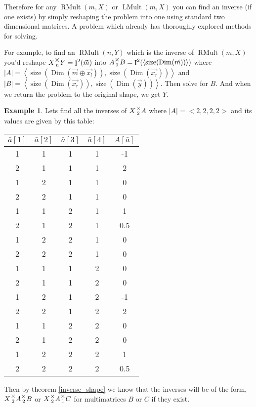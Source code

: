 \documentclass[12pt]{book}
\theoremstyle{plain}
\theoremstyle{definition}
\newtheorem{example}{Example}[chapter]
\theoremstyle{ppart}
\theoremstyle{case}
\theoremstyle{solution}
\DeclareMathOperator{\Dim}{Dim}
\DeclareMathOperator{\Ident}{I}
\DeclareMathOperator{\RMult}{RMult}
\DeclareMathOperator{\LMult}{LMult}
\DeclareMathOperator{\size}{size}
\newcommand{\mmult}[1]{\text{\raisebox{1ex}{$\underset{#1}{\times}$}}}
\newcommand{\shape}[1]{\left|#1\right|}
\begin{document}
Therefore for any $\RMult(m,X)$ or $\LMult(m,X)$ you can find an inverse (if one exists)
by simply reshaping the problem into one using standard two dimensional matrices.
A problem which already has thoroughly explored methods for solving.

For example, to find an $\RMult(n,Y)$ which is the inverse of $\RMult(m,X)$
you'd reshape $X \mmult{n} Y = \Ident^2(\vec{m})$ into $A \mmult{1} B = \Ident^2(\left<\size(\Dim(\vec{m}))\right>)$
where $\shape{A} = \left<\size(\Dim(\vec{m} \oplus \vec{x_l})), \size(\Dim(\vec{x_r}))\right>$
and   $\shape{B} = \left<\size(\Dim(\vec{x_r})),  \size(\Dim(\vec{y}))\right>$.
Then solve for $B$. And when we return the problem to the original shape, we get $Y$.

\begin{example}
Lets find all the inverses of $X \mmult{2} A$ where $\shape{A} = <2,2,2,2>$ and
its values are given by this table:
\begin{table}[h!]
\begin{center}
\begin{tabular}{c c c c | c}
$\bar{a}[1]$ & $\bar{a}[2]$ & $\bar{a}[3]$ & $\bar{a}[4]$ & $A[\bar{a}]$ \\
\hline
1           & 1           & 1           & 1           & -1 \\
2           & 1           & 1           & 1           & 2 \\
1           & 2           & 1           & 1           & 0 \\
2           & 2           & 1           & 1           & 0 \\

1           & 1           & 2           & 1           & 1 \\
2           & 1           & 2           & 1           & 0.5 \\
1           & 2           & 2           & 1           & 0 \\
2           & 2           & 2           & 1           & 0 \\

1           & 1           & 1           & 2           & 0 \\
2           & 1           & 1           & 2           & 0 \\
1           & 2           & 1           & 2           & -1 \\
2           & 2           & 1           & 2           & 2 \\

1           & 1           & 2           & 2           & 0 \\
2           & 1           & 2           & 2           & 0 \\
1           & 2           & 2           & 2           & 1 \\
2           & 2           & 2           & 2           & 0.5
\end{tabular}
\end{center}
\end{table}
Then by theorem \ref{inverse_shape} we know that the inverses will be of the form,
$X \mmult{2} A \mmult{2} B$ or $X \mmult{2} A \mmult{1} C$ for multimatrices
$B$ or $C$ if they exist.


\end{example}
\end{document}
